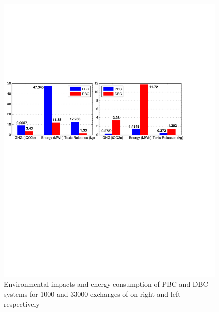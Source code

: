 \documentclass[conference]{IEEEtran}
\begin{document}

\begin{figure}[h]
\centering
\includegraphics[scale=0.48]{sf.pdf}
\caption{Environmental impacts and energy consumption of PBC and DBC systems for 1000 and 33000 exchanges of on right and left respectively}
\label{screen1}
\end{figure}
\end{document}
